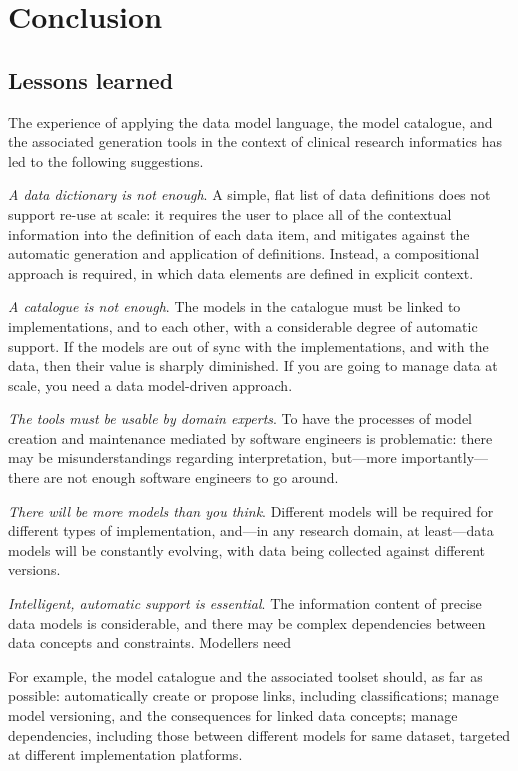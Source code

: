 
\section{Conclusion}

\subsection{Lessons learned}

The experience of applying the data model language, the model
catalogue, and the associated generation tools in the context of
clinical research informatics has led to the following suggestions.

\textsl{A data dictionary is not enough}. A simple, flat list of data
definitions does not support re-use at scale: it requires the user to
place all of the contextual information into the definition of each
data item, and mitigates against the automatic generation and
application of definitions.  Instead, a compositional approach is
required, in which data elements are defined in explicit context.

\textsl{A catalogue is not enough}.  The models in the catalogue must
be linked to implementations, and to each other, with a considerable
degree of automatic support.  If the models are out of sync with the
implementations, and with the data, then their value is sharply
diminished.  If you are going to manage data at scale, you need a data
model-driven approach. 

\textsl{The tools must be usable by domain experts}. To have the
processes of model creation and maintenance mediated by software
engineers is problematic: there may be misunderstandings regarding
interpretation, but---more importantly---there are not enough software
engineers to go around.  

\textsl{There will be more models than you think}.  Different models
will be required for different types of implementation, and---in any
research domain, at least---data models will be constantly evolving,
with data being collected against different versions.  

\textsl{Intelligent, automatic support is essential}. The information
content of precise data models is considerable, and there may be
complex dependencies between data concepts and constraints.  Modellers
need 

For example, the model catalogue and the associated toolset should, as
far as possible: automatically create or propose links, including
classifications; manage model versioning, and the consequences for
linked data concepts; manage dependencies, including those between
different models for same dataset, targeted at different
implementation platforms. 

